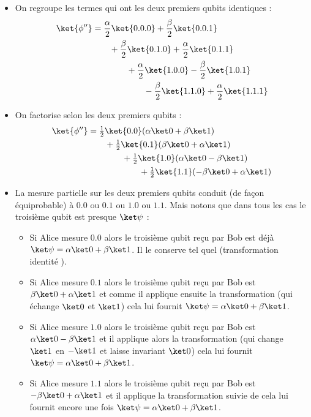 \documentclass[11pt,class=report,crop=false]{standalone}
\begin{document}
\begin{itemize}
\begin{itemize}
  \end{itemize}

  \item On regroupe les termes qui ont les deux premiers qubits identiques :
\begin{align*}
\ket{\phi''} 
  &= \frac{\alpha}{2}\ket{0.0.0} +  \frac{\beta}{2}\ket{0.0.1} \\
  &\qquad + \frac{\beta}{2}\ket{0.1.0}+ \frac{\alpha}{2}\ket{0.1.1} \\
  &\qquad\qquad + \frac{\alpha}{2}\ket{1.0.0} - \frac{\beta}{2}\ket{1.0.1}  \\
  &\qquad\qquad\qquad - \frac{\beta}{2}\ket{1.1.0} + \frac{\alpha}{2}\ket{1.1.1}  \\
\end{align*}

  \item On factorise selon les deux premiers qubits :
\begin{align*}
\ket{\phi''} 
  &= \tfrac{1}{2}\ket{0.0} (\alpha\ket0+\beta\ket1) \\
  &\qquad + \tfrac{1}{2}\ket{0.1}(\beta\ket0+\alpha\ket1) \\
  &\qquad\qquad + \tfrac{1}{2}\ket{1.0}(\alpha\ket0-\beta\ket1) \\
  &\qquad\qquad\qquad + \tfrac{1}{2}\ket{1.1}(-\beta\ket0+\alpha\ket1) \\
\end{align*}

  \item La mesure partielle sur les deux premiers qubits conduit (de façon équiprobable) à $0.0$ ou $0.1$ ou $1.0$ ou $1.1$.
  Mais notons que dans tous les cas le troisième qubit est presque $\ket\psi$ :
  \begin{itemize}
     \item Si Alice mesure $0.0$ alors le troisième qubit reçu par Bob est déjà $\ket\psi = \alpha\ket0+\beta\ket1$. Il le conserve tel quel (transformation identité ).
     \item Si Alice mesure $0.1$ alors le troisième qubit reçu par Bob est $\beta\ket0+\alpha\ket1$ et comme il applique ensuite la transformation  (qui échange $\ket0$ et $\ket1$) cela lui fournit $\ket\psi = \alpha\ket0+\beta\ket1$. 
     \item Si Alice mesure $1.0$ alors le troisième qubit reçu par Bob est $\alpha\ket0-\beta\ket1$ et il applique alors la transformation  (qui change $\ket1$ en $-\ket1$ et laisse invariant $\ket0$) cela lui fournit $\ket\psi = \alpha\ket0+\beta\ket1$. 
     \item Si Alice mesure $1.1$ alors le troisième qubit reçu par Bob est $-\beta\ket0+\alpha\ket1$ et il applique la transformation  suivie de  cela lui fournit encore une fois $\ket\psi = \alpha\ket0+\beta\ket1$. 
  \end{itemize}
\end{itemize}
\end{document}
